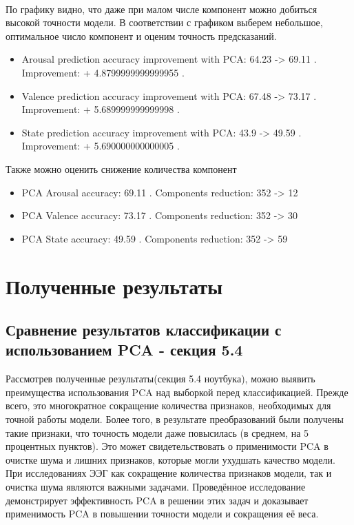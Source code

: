 \documentclass{article}
\begin{document}
    
\paragraph{}
По графику видно, что даже при малом числе компонент можно добиться высокой точности модели.
В соответствии с графиком выберем небольшое, оптимальное число компонент и оценим точность предсказаний.
\begin{itemize}
\item Arousal prediction accuracy improvement with PCA: 64.23 -> 69.11 . Improvement: + 4.8799999999999955 .
\item Valence prediction accuracy improvement with PCA: 67.48 -> 73.17 . Improvement: + 5.689999999999998 .
\item State prediction accuracy improvement with PCA: 43.9 -> 49.59 . Improvement: + 5.690000000000005 .
\end{itemize}

Также можно оценить снижение количества компонент

\begin{itemize}
\item PCA Arousal accuracy: 69.11 . Components reduction:  352  ->  12
\item PCA Valence accuracy: 73.17 . Components reduction:  352  ->  30
\item PCA State accuracy: 49.59 . Components reduction:  352  ->  59
\end{itemize}

\section{Полученные результаты}
\subsection{Сравнение результатов классификации с использованием PCA - секция 5.4}
Рассмотрев полученные результаты(секция 5.4 ноутбука), можно выявить преимущества использования PCA над выборкой перед классификацией. Прежде всего, это многократное сокращение количества признаков, необходимых для точной работы модели. Более того, в результате преобразований были получены такие признаки, что точность модели даже повысилась (в среднем, на 5 процентных пунктов). Это может свидетельствовать о применимости PCA в очистке шума и лишних признаков, которые могли ухудшать качество модели.
При исследованиях ЭЭГ как сокращение количества признаков модели, так и очистка шума являются важными задачами. Проведённое исследование демонстрирует эффективность PCA в решении этих задач и доказывает применимость PCA в повышении точности модели и сокращения её веса.
\end{document}
